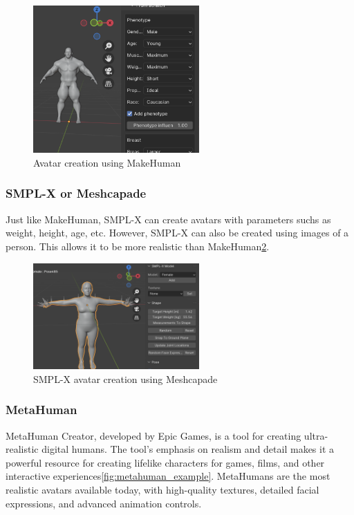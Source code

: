 \begin{figure}
  \centering \includegraphics[width = 2.5in]{images/background_work/makehuman_example.png}
  \caption{Avatar creation using MakeHuman}
  \label{fig:makehuman_example}
\end{figure}

\subsubsection{SMPL-X or Meshcapade}

Just like MakeHuman, SMPL-X can create avatars with parameters suchs as weight, height, age, etc. However, SMPL-X can also be created using images of a person. This allows it to be more realistic than MakeHuman\ref{fig:smpl_creation_example}.

\begin{figure}
  \centering \includegraphics[width = 2.5in]{images/background_work/smpl_creation_example.png}
  \caption{SMPL-X avatar creation using Meshcapade}
  \label{fig:smpl_creation_example}
\end{figure}

\subsubsection{MetaHuman}

MetaHuman Creator, developed by Epic Games, is a tool for creating ultra-realistic digital humans. The tool's emphasis on realism and detail makes it a powerful resource for creating lifelike characters for games, films, and other interactive experiences\ref{fig:metahuman_example}. MetaHumans are the most realistic avatars available today, with high-quality textures, detailed facial expressions, and advanced animation controls.

